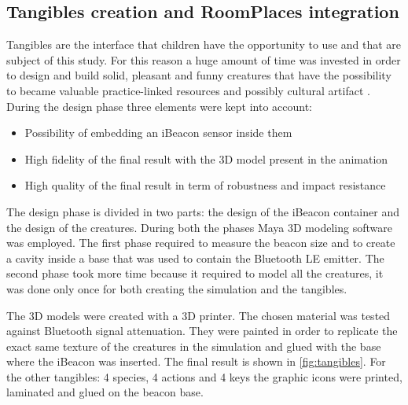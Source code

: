 \subsection{Tangibles creation and RoomPlaces integration}
Tangibles are the interface that children have the opportunity to use and that are subject of this study. For this reason a huge amount of time was invested in order to design and build solid, pleasant and funny creatures that have the possibility to became valuable practice-linked resources and possibly cultural artifact \cite{horn:role}. During the design phase three elements were kept into account:
\begin{itemize}
\item Possibility of embedding an iBeacon sensor inside them
\item High fidelity of the final result with the 3D model present in the animation
\item High quality of the final result in term of robustness and impact resistance 
\end{itemize}

The design phase is divided in two parts: the design of the iBeacon container and the design of the creatures. During both the phases Maya 3D modeling software was employed. The first phase required to measure the beacon size and to create a cavity inside a base that was used to contain the Bluetooth LE emitter. The second phase took more time because it required to model all the creatures, it was done only once for both creating the simulation and the tangibles.

The 3D models were created with a 3D printer. The chosen material was tested against Bluetooth signal attenuation. They were painted in order to replicate the exact same texture of the creatures in the simulation and glued with the base where the iBeacon was inserted. The final result is shown in \ref{fig:tangibles}. For the other tangibles: 4 species, 4 actions and 4 keys the graphic icons were printed, laminated and glued on the beacon base.

